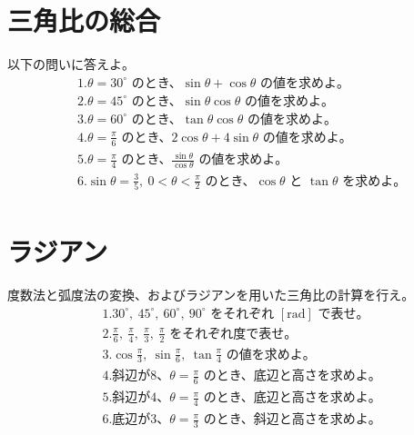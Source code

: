 \documentclass[paper=b4j,landscape,twocolumn,fleqn]{jlreq}
\begin{document}
\section{三角比の総合}
以下の問いに答えよ。
\begin{align*}
　&1.　\theta=30^\circ\text{ のとき、}\sin\theta+\cos\theta\text{ の値を求めよ。}\\[0.45em]
　&2.　\theta=45^\circ\text{ のとき、}\sin\theta\cos\theta\text{ の値を求めよ。}\\[0.45em]
　&3.　\theta=60^\circ\text{ のとき、}\tan\theta\cos\theta\text{ の値を求めよ。}\\[0.45em]
　&4.　\theta=\frac{\pi}{6}\text{ のとき、}2\cos\theta+4\sin\theta\text{ の値を求めよ。}\\[0.45em]
　&5.　\theta=\frac{\pi}{4}\text{ のとき、}\frac{\sin\theta}{\cos\theta}\text{ の値を求めよ。}\\[0.45em]
　&6.　\sin\theta=\frac{3}{5},\ 0<\theta<\frac{\pi}{2}\text{ のとき、}\cos\theta\text{ と }\tan\theta\text{ を求めよ。}\\[0.45em]
\end{align*}

\newpage

\section{ラジアン}
度数法と弧度法の変換、およびラジアンを用いた三角比の計算を行え。
\begin{align*}
　&1.　30^\circ,\ 45^\circ,\ 60^\circ,\ 90^\circ\text{ をそれぞれ }[\mathrm{rad}]\text{ で表せ。}\\[0.45em]
　&2.　\frac{\pi}{6},\ \frac{\pi}{4},\ \frac{\pi}{3},\ \frac{\pi}{2}\text{ をそれぞれ度で表せ。}\\[0.45em]
　&3.　\cos \frac{\pi}{3},\ \sin \frac{\pi}{6},\ \tan \frac{\pi}{4}\text{ の値を求めよ。}\\[0.45em]
　&4.　斜辺が8、\theta=\frac{\pi}{6}\text{ のとき、底辺と高さを求めよ。}\\[0.45em]
　&5.　斜辺が4、\theta=\frac{\pi}{4}\text{ のとき、底辺と高さを求めよ。}\\[0.45em]
　&6.　底辺が3、\theta=\frac{\pi}{3}\text{ のとき、斜辺と高さを求めよ。}\\[0.45em]
\end{align*}
\end{document}
